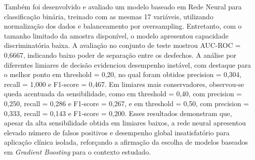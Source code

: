 \documentclass[12pt, a4paper]{report}
\theoremstyle{definition}
\theoremstyle{remark}
\theoremstyle{plain}
\begin{document}
Também foi desenvolvido e avaliado um modelo baseado em Rede Neural para classificação binária, treinado com as mesmas 17 variáveis, utilizando normalização dos dados e balanceamento por oversampling. Entretanto, com o tamanho limitado da amostra disponível, o modelo apresentou capacidade discriminatória baixa. A avaliação no conjunto de teste mostrou AUC-ROC = 0,6667, indicando baixo poder de separação entre os desfechos. A análise por diferentes limiares de decisão evidenciou desempenho instável, com destaque para o melhor ponto em threshold = 0,20, no qual foram obtidos precision = 0,304, recall = 1,000 e F1-score = 0,467. Em limiares mais conservadores, observou-se queda acentuada da sensibilidade, como em threshold = 0,40, com precision = 0,250, recall = 0,286 e F1-score = 0,267, e em threshold = 0,50, com precision = 0,333, recall = 0,143 e F1-score = 0,200. Esses resultados demonstram que, apesar da alta sensibilidade obtida em limiares baixos, a rede neural apresentou elevado número de falsos positivos e desempenho global insatisfatório para aplicação clínica isolada, reforçando a afirmação da escolha de modelos baseados em \textit{Gradient Boosting} para o contexto estudado.

\setlength{\tabcolsep}{4pt}
\renewcommand{\arraystretch}{1.25}
\end{document}

